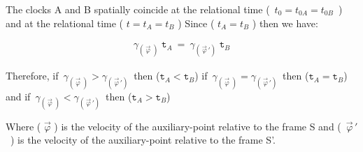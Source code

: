 \documentclass[10pt,fleqn]{article}
\begin{document}
\noindent The clocks A and B spatially coincide at the relational time \hbox {{\small ( $t_0 = t_{0A} = t_{0B}$ )}} and at the relational time {\small ( $t = t_{A} = t_{B}$ )} Since {\small ( $t_{A} = t_{B}$ )} then we have:
\par \vspace{-0.66em}
\begin{eqnarray*}
\gamma_{(\,\vec\varphi\;)} \; \mathtt{t}_{A} ~=~ \gamma_{(\,\vec\varphi\,')} \; \mathtt{t}_{B}
\end{eqnarray*}
\par \vspace{+0.81em}
\noindent Therefore, if {\small $\,\gamma_{(\,\vec\varphi\;)} > \gamma_{(\,\vec\varphi\,')}\,$} then {\small (\:$\mathtt{t}_{A} < \mathtt{t}_{B}$\:)} if {\small $\,\gamma_{(\,\vec\varphi\;)} = \gamma_{(\,\vec\varphi\,')}\,$} then \hbox {\small {(\:$\mathtt{t}_{A} = \mathtt{t}_{B}$\:)}} and if {\small $\,\gamma_{(\,\vec\varphi\;)} < \gamma_{(\,\vec\varphi\,')}\,$} then {\small (\:$\mathtt{t}_{A} > \mathtt{t}_{B}$\:)}
\par \vspace{+0.90em}
\noindent Where {\small ( $\vec\varphi$ )} is the velocity of the auxiliary-point relative to the frame S and \hbox {{\small ( $\vec\varphi\,'$ )}} is the velocity of the auxiliary-point relative to the frame S'.

\newpage

\par {}

\bigskip \smallskip
\end{document}
